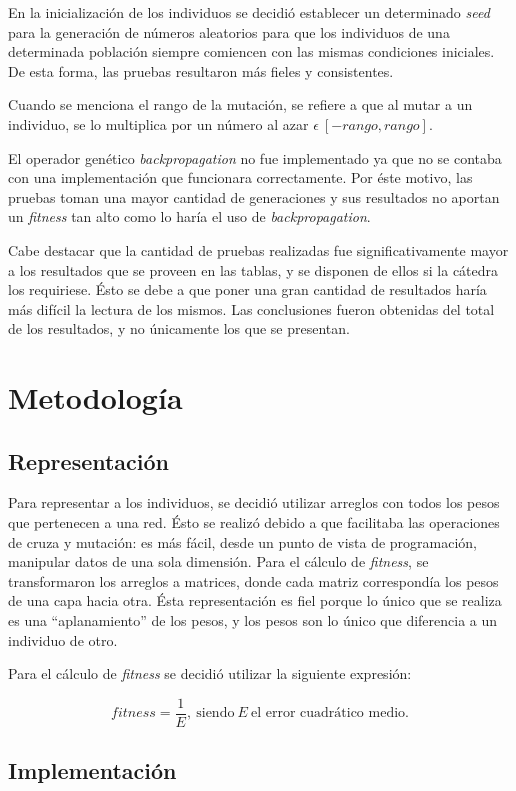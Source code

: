 \documentclass[11pt,a4paper]{article}
\begin{document}
En la inicialización de los individuos se decidió establecer un determinado \emph{seed} para la generación de números aleatorios para que los individuos de una determinada población siempre comiencen con las mismas condiciones iniciales. De esta forma, las pruebas resultaron más fieles y consistentes.

Cuando se menciona el rango de la mutación, se refiere a que al mutar a un individuo, se lo multiplica por un número al azar $\epsilon \ [-rango, rango]$.

El operador genético \emph{backpropagation} no fue implementado ya que no se contaba con una implementación que funcionara correctamente. Por éste motivo, las pruebas toman una mayor cantidad de generaciones y sus resultados no aportan un \emph{fitness} tan alto como lo haría el uso de \emph{backpropagation}.

Cabe destacar que la cantidad de pruebas realizadas fue significativamente mayor a los resultados que se proveen en las tablas, y se disponen de ellos si la cátedra los requiriese. Ésto se debe a que poner una gran cantidad de resultados haría más difícil la lectura de los mismos. Las conclusiones fueron obtenidas del total de los resultados, y no únicamente los que se presentan. 

\section{Metodología}
\subsection{Representación}

Para representar a los individuos, se decidió utilizar arreglos con todos los pesos que pertenecen a una red. Ésto se realizó debido a que facilitaba las operaciones de cruza y mutación: es más fácil, desde un punto de vista de programación, manipular datos de una sola dimensión. Para el cálculo de \emph{fitness}, se transformaron los arreglos a matrices, donde cada matriz correspondía  los pesos de una capa hacia otra. Ésta representación es fiel porque lo único que se realiza es una ``aplanamiento'' de los pesos, y los pesos son lo único que diferencia a un individuo de otro.

Para el cálculo de \emph{fitness} se decidió utilizar la siguiente expresión:

$$fitness = \frac{1}{E},\ \text{siendo} \ E \ \text{el error cuadrático medio.}$$

\subsection{Implementación}
\end{document}
